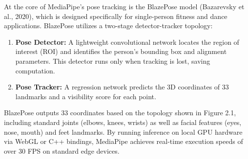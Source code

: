 At the core of MediaPipe's pose tracking is the BlazePose model (Bazarevsky et al., 2020), which is designed specifically for single-person fitness and dance applications. BlazePose utilizes a two-stage detector-tracker topology:
\begin{enumerate}
    \item \textbf{Pose Detector:} A lightweight convolutional network locates the region of interest (ROI) and identifies the person's bounding box and alignment parameters. This detector runs only when tracking is lost, saving computation.
    \item \textbf{Pose Tracker:} A regression network predicts the 3D coordinates of 33 landmarks and a visibility score for each point.
\end{enumerate}
BlazePose outputs 33 coordinates based on the topology shown in Figure 2.1, including standard joints (elbows, knees, wrists) as well as facial features (eyes, nose, mouth) and feet landmarks. By running inference on local GPU hardware via WebGL or C++ bindings, MediaPipe achieves real-time execution speeds of over 30 FPS on standard edge devices.

